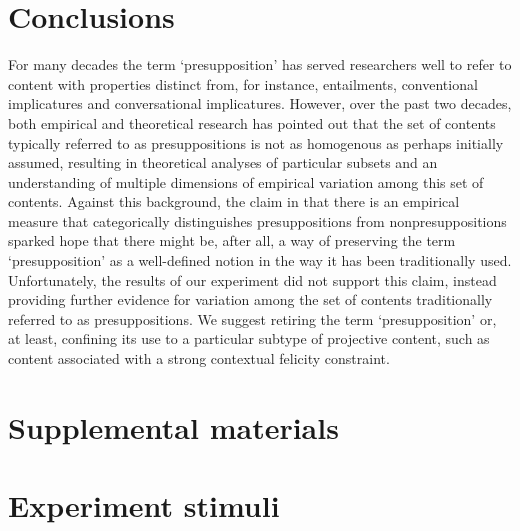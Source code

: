 \documentclass[11pt,fleqn]{article}
\newcommand{\6}{\mbox{$[\hspace*{-.6mm}[$}}
\newcommand{\9}{\mbox{$]\hspace*{-.6mm}]$}}
\begin{document}
\section{Conclusions}\label{s4}

For many decades the term `presupposition' has served researchers well to refer to content with properties distinct from, for instance, entailments, conventional implicatures and conversational implicatures. However, over the past two decades, both empirical and theoretical research has pointed out that the set of contents typically referred to as presuppositions is not as homogenous as perhaps initially assumed, resulting in theoretical analyses of particular subsets and an understanding of multiple dimensions of empirical variation among this set of contents. Against this background, the claim in \citealt{mandelkern-etal2020} that there is an empirical measure that categorically distinguishes presuppositions from nonpresuppositions sparked hope that there might be, after all, a way of preserving the term `presupposition' as a well-defined notion in the way it has been traditionally used.  Unfortunately, the results of our experiment did not support this claim, instead providing further evidence for variation among the set of contents traditionally referred to as presuppositions. We suggest retiring the term `presupposition' or, at least, confining its use to a particular subtype of projective content, such as content associated with a strong contextual felicity constraint.






%


\newpage

\section*{Supplemental materials}

\appendix

\setcounter{page}{1}

\setcounter{table}{0}
\renewcommand{\thetable}{A\arabic{table}}

\setcounter{figure}{0}
\renewcommand{\thefigure}{A\arabic{figure}}

\section{Experiment stimuli}\label{a:clauses}
\end{document}
